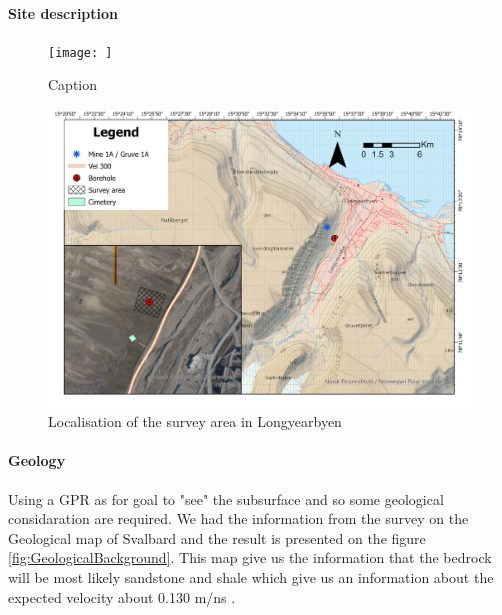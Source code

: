 \paragraph{Site description} \label{Paragraph:SiteDescription}

\begin{figure}
    \centering
    \texttt{[image: ]}
    \caption{Caption}
    \label{fig:my_label}
\end{figure}


\begin{figure}
    \centering
    \includegraphics[width=\linewidth]{Images/00_Methodology/GeographicSituation.jpg}
    \caption{Localisation of the survey area in Longyearbyen}
    \label{fig:Location}
\end{figure}


\paragraph{Geology} Using a GPR as for goal to "see" the subsurface and so some geological considaration are required. We had the information from the survey on the Geological map of Svalbard \cite{Atakan2015GeoscienceSvalbard} and the result is presented on the figure \ref{fig:GeologicalBackground}. This map give us the information that the bedrock will be most likely sandstone and shale which give us an information about the expected velocity about 0.130 m/ns \cite{GPRAnalysis}.

